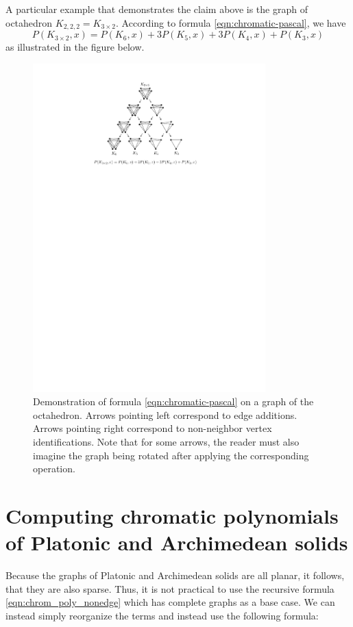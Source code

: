 A particular example that demonstrates the claim above is the graph of octahedron $K_{2,2,2} = K_{3 \times 2}$. According to formula \ref{eqn:chromatic-pascal}, we have \[ P(K_{3 \times 2},x) = P(K_6,x)+3P(K_5,x) + 3P(K_4,x)+P(K_3,x)\] as illustrated in the figure below.

\begin{figure}[H]
    \centering
    \includegraphics[width=0.8\textwidth]{Resources/Figs/octahedral_pascal_demo.pdf}
    \caption{Demonstration of formula \ref{eqn:chromatic-pascal} on a graph of the octahedron. Arrows pointing left correspond to edge additions. Arrows pointing right correspond to non-neighbor vertex identifications. Note that for some arrows, the reader must also imagine the graph being rotated after applying the corresponding operation.}
\end{figure}

\section{Computing chromatic polynomials of Platonic and Archimedean solids}

Because the graphs of Platonic and Archimedean solids are all planar, it follows, that they are also sparse. Thus, it is not practical to use the recursive formula \ref{eqn:chrom_poly_nonedge} which has complete graphs as a base case. We can instead simply reorganize the terms and instead use the following formula:

